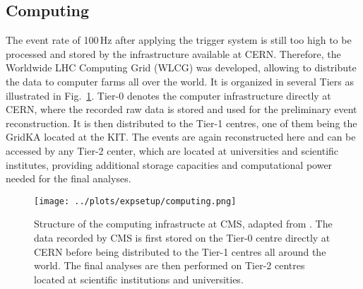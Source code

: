 \subsection*{Computing}
The event rate of 100\,Hz after applying the trigger system is still too high to be processed and stored by the infrastructure available at CERN. Therefore, the Worldwide LHC Computing Grid (WLCG) was developed, allowing to distribute the data to computer farms all over the world. It is organized in several Tiers as illustrated in Fig.~\ref{fig:expsetup:computing}. Tier-0 denotes the computer infrastructure directly at CERN, where the recorded raw data is stored and used for the preliminary event reconstruction. It is then distributed to the Tier-1 centres, one of them being the GridKA located at the KIT. The events are again reconstructed here and can be accessed by any Tier-2 center, which are located at universities and scientific institutes, providing additional storage capacities and computational power needed for the final analyses.
\begin{figure}
	\centering
	\texttt{[image: ../plots/expsetup/computing.png]}
	\caption[Structure of the computing infrastructe at CMS]{Structure of the computing infrastructe at CMS, adapted from \cite{computing_fig}. The data recorded by CMS is first stored on the Tier-0 centre directly at CERN before being distributed to the Tier-1 centres all around the world. The final analyses are then performed on Tier-2 centres located at scientific institutions and universities.}
	\label{fig:expsetup:computing}
\end{figure}